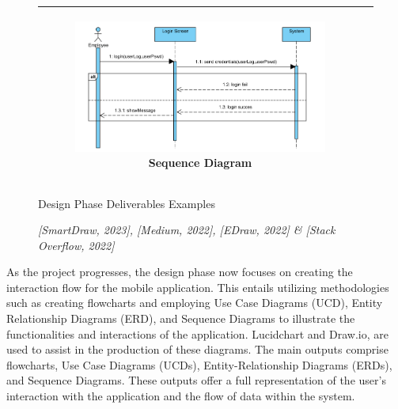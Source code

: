 \begin{figure}[ht]
\begin{tabular}{|c|c|}
		\begin{subfigure}[b]{0.44\textwidth}
			\centering
			\vspace{0.2cm}
			\includegraphics[width=0.8\linewidth]{mainmatter/images/examplesequencediagram.png}
			\caption{Sequence Diagram}
         	\label{fig:myfig34}
		\end{subfigure}	\\
		\hline		
	\end{tabular}
    \caption{Design Phase Deliverables Examples}
	\caption*{\textit{[SmartDraw, 2023], [Medium, 2022], [EDraw, 2022] \& [Stack Overflow, 2022]}}
    \label{fig:the4fig}
\end{figure}

As the project progresses, the design phase now focuses on creating the interaction flow for the mobile application. This entails utilizing methodologies such as creating flowcharts and employing Use Case Diagrams (UCD), Entity Relationship Diagrams (ERD), and Sequence Diagrams to illustrate the functionalities and interactions of the application. Lucidchart and Draw.io, are used to assist in the production of these diagrams. The main outputs comprise flowcharts, Use Case Diagrams (UCDs), Entity-Relationship Diagrams (ERDs), and Sequence Diagrams. These outputs offer a full representation of the user's interaction with the application and the flow of data within the system.
\pagebreak

